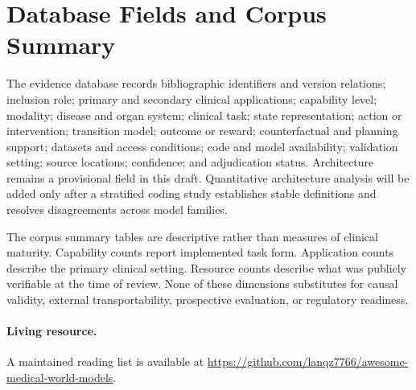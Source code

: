 \section{Database Fields and Corpus Summary}
\label{app:database}

The evidence database records bibliographic identifiers and version relations; inclusion role; primary and secondary clinical applications; capability level; modality; disease and organ system; clinical task; state representation; action or intervention; transition model; outcome or reward; counterfactual and planning support; datasets and access conditions; code and model availability; validation setting; source locations; confidence; and adjudication status. Architecture remains a provisional field in this draft. Quantitative architecture analysis will be added only after a stratified coding study establishes stable definitions and resolves disagreements across model families.

The corpus summary tables are descriptive rather than measures of clinical maturity. Capability counts report implemented task form. Application counts describe the primary clinical setting. Resource counts describe what was publicly verifiable at the time of review. None of these dimensions substitutes for causal validity, external transportability, prospective evaluation, or regulatory readiness.

\ifworkingdraft
\paragraph{Living resource.} A maintained reading list is available at \url{https://github.com/lanqz7766/awesome-medical-world-models}.
\fi



